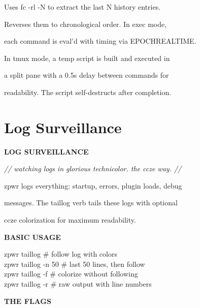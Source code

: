 \documentclass[11pt,a4paper,twoside]{book}
\begin{document}
Uses fc -rl -N to extract the last N history entries.

Reverses them to chronological order. In exec mode,

each command is eval'd with timing via EPOCHREALTIME.

In tmux mode, a temp script is built and executed in

a split pane with a 0.5s delay between commands for

readability. The script self-destructs after completion.


\vspace{16pt}

\section{Log Surveillance}


\vspace{10pt}
{\large\bfseries\color{neoncyan} LOG SURVEILLANCE}\vspace{6pt}

{\small\itshape\color{dimtext} // watching logs in glorious technicolor. the ccze way. //}

\begin{codebox}
zpwr logs everything: startup, errors, plugin loads, debug\\
\end{codebox}

messages. The taillog verb tails these logs with optional

ccze colorization for maximum readability.


\vspace{12pt}
{\bfseries\color{neonyellow} BASIC USAGE}\vspace{4pt}

\begin{codebox}
zpwr taillog                        \# follow log with colors\\
zpwr taillog -n 50                  \# last 50 lines, then follow\\
zpwr taillog -f                     \# colorize without following\\
zpwr taillog -r                     \# raw output with line numbers\\
\end{codebox}


\vspace{12pt}
{\bfseries\color{neonyellow} THE FLAGS}\vspace{4pt}
\end{document}

